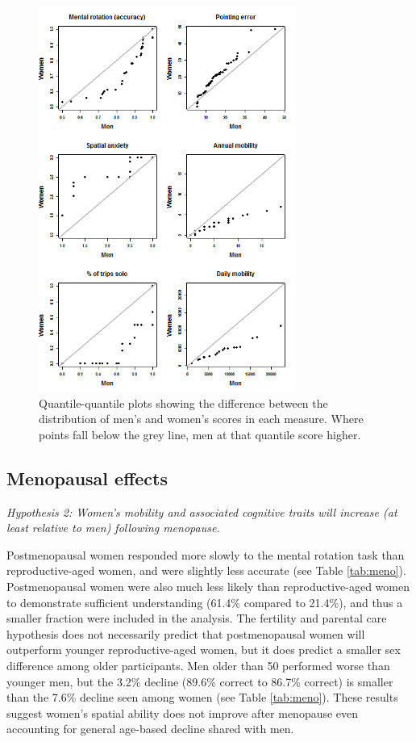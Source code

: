 \begin{figure}[!htb]
  \includegraphics[width=0.75\textwidth]{QQ_sex}
\caption{Quantile-quantile plots showing the difference between the distribution of men's and women's scores in each measure. Where points fall below the grey line, men at that quantile score higher.}
\label{fig:sex}       %
\end{figure}


	\subsection{Menopausal effects}
	\label{sec:3.2}
	
\emph{Hypothesis 2: Women's mobility and associated cognitive traits will increase (at least relative to men) following menopause.}	
\smallskip
	
Postmenopausal women responded more slowly to the mental rotation task than reproductive-aged women, and were slightly less accurate (see Table \ref{tab:meno}).  Postmenopausal women were also much less likely than reproductive-aged women to demonstrate sufficient understanding (61.4\% compared to 21.4\%), and thus a smaller fraction were included in the analysis.  The fertility and parental care hypothesis does not necessarily predict that postmenopausal women will outperform younger reproductive-aged women, but it does predict a smaller sex difference among older participants.  Men older than 50 performed worse than younger men, but the 3.2\% decline (89.6\% correct to 86.7\% correct) is smaller than the 7.6\% decline seen among women (see Table \ref{tab:meno}).  These results suggest women's spatial ability does not improve after menopause even accounting for general age-based decline shared with men.  

